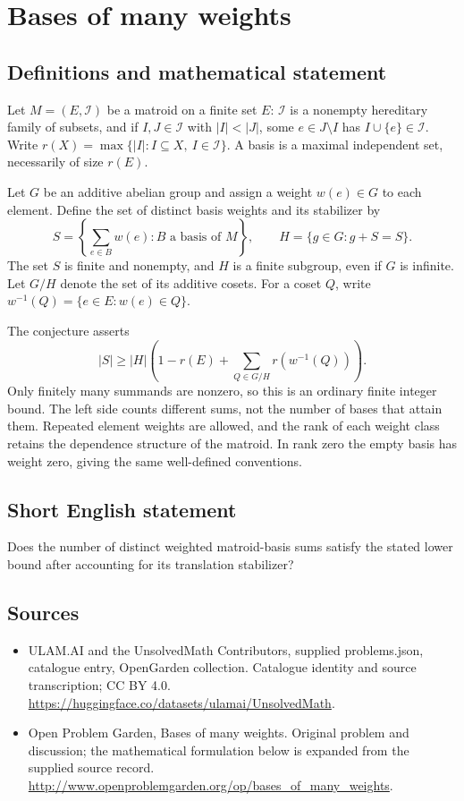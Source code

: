 \documentclass[11pt,a4paper]{article}
\begin{document}
\section*{Bases of many weights}\label{statement}

\subsection{Definitions and mathematical statement}
Let $M=(E,\mathcal I)$ be a matroid on a finite set $E$: $\mathcal I$ is
a nonempty hereditary family of subsets, and if $I,J\in\mathcal I$ with
$|I|<|J|$, some $e\in J\setminus I$ has $I\cup\{e\}\in\mathcal I$.
Write $r(X)=\max\{|I|:I\subseteq X,\ I\in\mathcal I\}$.
A basis is a maximal independent set, necessarily of size $r(E)$.

Let $G$ be an additive abelian group and assign a weight $w(e)\in G$
to each element. Define the set of distinct basis weights and its stabilizer by
\[
 S=\left\{\sum_{e\in B}w(e):B\text{ a basis of }M\right\},\qquad
 H=\{g\in G:g+S=S\}.
\]
The set $S$ is finite and nonempty, and $H$ is a finite subgroup, even
if $G$ is infinite. Let $G/H$ denote the set of its additive cosets.
For a coset $Q$, write $w^{-1}(Q)=\{e\in E:w(e)\in Q\}$.

The conjecture asserts
\[
 |S|\ge |H|\left(1-r(E)+
                 \sum_{Q\in G/H}r(w^{-1}(Q))\right).
\]
Only finitely many summands are nonzero, so this is an ordinary finite
integer bound. The left side counts different sums, not the number of
bases that attain them. Repeated element weights are allowed, and the
rank of each weight class retains the dependence structure of the
matroid. In rank zero the empty basis has weight zero, giving the same
well-defined conventions.
\subsection{Short English statement}
Does the number of distinct weighted matroid-basis sums satisfy the stated lower bound after accounting for its translation stabilizer?
\subsection{Sources}
\begin{itemize}
\item[S1] ULAM.AI and the UnsolvedMath Contributors, supplied problems.json, catalogue entry, OpenGarden collection. Catalogue identity and source transcription; CC BY 4.0.
\url{https://huggingface.co/datasets/ulamai/UnsolvedMath}.
\item[S2] Open Problem Garden, Bases of many weights. Original problem and discussion; the mathematical formulation below is expanded from the supplied source record.
\url{http://www.openproblemgarden.org/op/bases_of_many_weights}.
\end{itemize}
\end{document}
